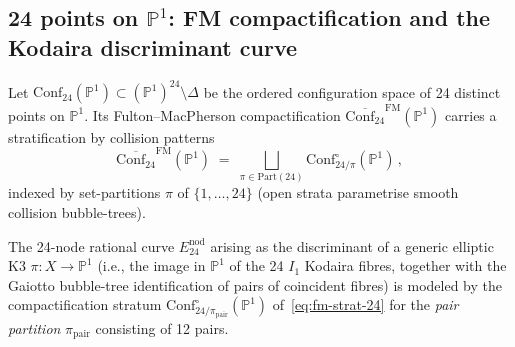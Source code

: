 \subsection{\texorpdfstring{24 points on $\mathbb{P}^1$: FM compactification and
the Kodaira discriminant curve}{24 points on P1: FM compactification and the Kodaira discriminant curve}}
\label{subsec:fm-24pts-P1}

\begin{definition}
\label{def:fm-conf24-P1}
Let $\mathrm{Conf}_{24}(\mathbb{P}^1) \subset (\mathbb{P}^1)^{24}\setminus\Delta$
be the ordered configuration space of 24 distinct points on
$\mathbb{P}^1$. Its Fulton--MacPherson compactification
$\overline{\mathrm{Conf}_{24}}^{\mathrm{FM}}(\mathbb{P}^1)$
carries a stratification by collision patterns
\begin{equation}
\label{eq:fm-strat-24}
\overline{\mathrm{Conf}_{24}}^{\mathrm{FM}}(\mathbb{P}^1)
\;=\;
\bigsqcup_{\pi\in\mathrm{Part}(24)}
\mathrm{Conf}_{24/\pi}^{\circ}(\mathbb{P}^1)\,,
\end{equation}
indexed by set-partitions $\pi$ of $\{1,\ldots,24\}$ (open strata
parametrise smooth collision bubble-trees).
\end{definition}

\begin{conjecture}
\label{conj:fm-24-node-stratum}
The 24-node rational curve $E^{\mathrm{nod}}_{24}$ arising as the
discriminant of a generic elliptic K3 $\pi\colon X\to\mathbb{P}^1$
(i.e., the image in $\mathbb{P}^1$ of the 24 $I_1$ Kodaira
fibres, together with the Gaiotto bubble-tree identification of
pairs of coincident fibres) is modeled by the
compactification stratum
$\mathrm{Conf}_{24/\pi_{\mathrm{pair}}}^{\circ}(\mathbb{P}^1)$
of~\eqref{eq:fm-strat-24} for the
\emph{pair partition} $\pi_{\mathrm{pair}}$ consisting of 12 pairs.
\end{conjecture}

